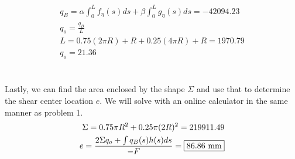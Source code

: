 \documentclass[12 pt]{article}
\begin{document}
\begin{align*}
    q_B=\alpha \int_{0}^{L}{f_{\eta}(s)ds} + \beta \int_{0}^{L}{g_{\eta}(s)ds}=-42094.23 \\
    q_o=\frac{q_B}{L} \\
    L = 0.75(2\pi R)+R+0.25(4\pi R)+R=1970.79 \\
    q_o=21.36
\end{align*} \\ \\
Lastly, we can find the area enclosed by the shape $\Sigma$ and use that to determine the shear center location $e$. We
will solve with an online calculator in the same manner as problem 1.
\begin{align*}
    \Sigma=0.75\pi R^2+0.25\pi(2R)^2=219911.49 \\
    e=\frac{2\Sigma q_o+\int{q_B(s)h(s)ds}}{-F} = \fbox{$86.86$ mm}
\end{align*}
\end{document}
